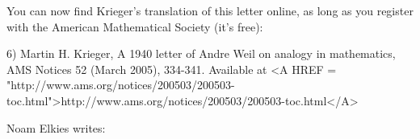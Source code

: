 You can now find Krieger's translation of this letter 
online, as long as you register with the American
Mathematical Society (it's free):

6) Martin H. Krieger, A 1940 letter of Andre Weil on analogy
in mathematics, AMS Notices 52 (March 2005), 334-341.  Available
at <A HREF = "http://www.ams.org/notices/200503/200503-toc.html">http://www.ams.org/notices/200503/200503-toc.html</A>


Noam Elkies writes:



